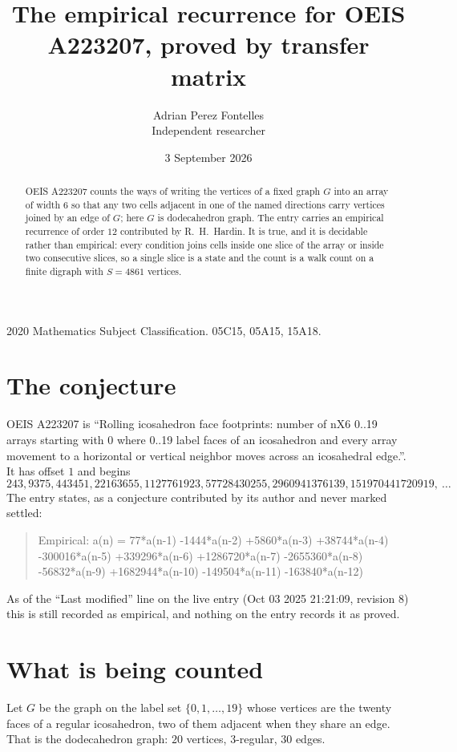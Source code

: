 \documentclass[11pt,a4paper]{article}
\title{The empirical recurrence for OEIS A223207, proved by transfer matrix}
\author{Adrian Perez Fontelles\\ \small Independent researcher}
\date{3 September 2026}
\theoremstyle{plain}
\theoremstyle{definition}
\begin{document}
\maketitle

\begin{abstract}
OEIS A223207 counts the ways of writing the vertices of a fixed graph $G$ into an array of width
$6$ so that any two cells adjacent in one of the named directions carry vertices joined by an
edge of $G$; here $G$ is dodecahedron graph. The entry carries an empirical recurrence of order $12$
contributed by R.~H.~Hardin. It is true, and it is decidable rather than empirical: every
condition joins cells inside one slice of the array or inside two consecutive slices, so a
single slice is a state and the count is a walk count on a finite digraph with $S=4861$ vertices.
\end{abstract}

\noindent\small 2020 Mathematics Subject Classification. 05C15, 05A15, 15A18.\normalsize

\section{The conjecture}

OEIS A223207 is ``Rolling icosahedron face footprints: number of nX6 0..19 arrays starting with 0 where 0..19 label faces of an icosahedron and every array movement to a horizontal or vertical neighbor moves across an icosahedral edge.''. It has offset $1$ and begins
\[
243, 9375, 443451, 22163655, 1127761923, 57728430255, 2960941376139, 151970441720919,\ \dots
\]
The entry states, as a conjecture contributed by its author and never marked settled:
\begin{quote}
Empirical: a(n) = 77*a(n-1) -1444*a(n-2) +5860*a(n-3) +38744*a(n-4) -300016*a(n-5) +339296*a(n-6) +1286720*a(n-7) -2655360*a(n-8) -56832*a(n-9) +1682944*a(n-10) -149504*a(n-11) -163840*a(n-12)
\end{quote}
As of the ``Last modified'' line on the live entry (Oct 03 2025 21:21:09, revision 8) this is still
recorded as empirical, and nothing on the entry records it as proved.

\section{What is being counted}

Let $G$ be the graph on the label set $\{0,1,\dots,19\}$ whose vertices are the twenty faces of a regular icosahedron, two of them adjacent when they share an edge. That is the dodecahedron graph: $20$ vertices, $3$-regular, $30$ edges.
\end{document}
